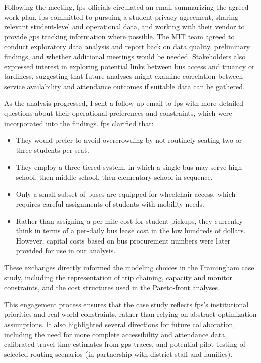 Following the meeting, \gls{fps} officials circulated an email summarizing the agreed work plan. \Gls{fps} committed to pursuing a student privacy agreement, sharing relevant student-level and operational data, and working with their vendor to provide \Gls{gps} tracking information where possible. The MIT team agreed to conduct exploratory data analysis and report back on data quality, preliminary findings, and whether additional meetings would be needed. Stakeholders also expressed interest in exploring potential links between bus access and truancy or tardiness, suggesting that future analyses might examine correlation between service availability and attendance outcomes if suitable data can be gathered.

As the analysis progressed, I sent a follow-up email to \gls{fps} with more detailed questions about their operational preferences and constraints, which were incorporated into the findings. \Gls{fps} clarified that:

\begin{itemize}
    \item They would prefer to avoid overcrowding by not routinely seating two or three students per seat.
    \item They employ a three-tiered system, in which a single bus may serve high school, then middle school, then elementary school in sequence.
    \item Only a small subset of buses are equipped for wheelchair access, which requires careful assignments of students with mobility needs.
    \item Rather than assigning a per-mile cost for student pickups, they currently think in terms of a per-daily bus lease cost in the low hundreds of dollars. However, capital costs based on bus procurement numbers were later provided for use in our analysis.
\end{itemize}

These exchanges directly informed the modeling choices in the Framingham case study, including the representation of trip chaining, capacity and monitor constraints, and the cost structures used in the Pareto-front analyses.

This engagement process ensures that the case study reflects \gls{fps}'s institutional priorities and real-world constraints, rather than relying on abstract optimization assumptions. It also highlighted several directions for future collaboration, including the need for more complete accessibility and attendance data, calibrated travel-time estimates from \gls{gps} traces, and potential pilot testing of selected routing scenarios (in partnership with district staff and families).